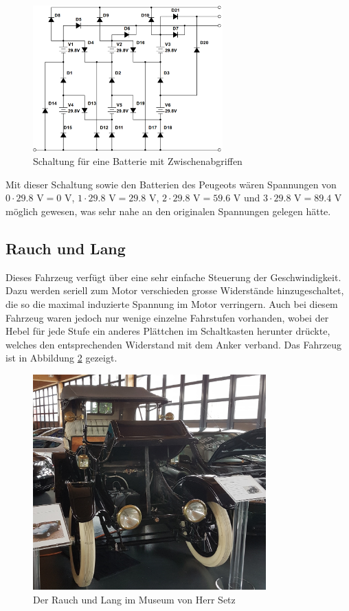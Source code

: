 \begin{figure}[h!]
	\centering
		\includegraphics[width=0.65\textwidth]{images/68.PNG}
	\caption{Schaltung für eine Batterie mit Zwischenabgriffen}
	\label{fig:68}
\end{figure}

Mit dieser Schaltung sowie den Batterien des Peugeots wären Spannungen von $0\cdot29.8$ V$=0$ V, $1\cdot29.8$ V$=29.8$ V, $2\cdot29.8$ V$=59.6$ V und $3\cdot29.8$ V$=89.4$ V möglich gewesen, was sehr nahe an den originalen Spannungen gelegen hätte.

\subsection{Rauch und Lang}
Dieses Fahrzeug verfügt über eine sehr einfache Steuerung der Geschwindigkeit. Dazu werden seriell zum Motor verschieden grosse Widerstände hinzugeschaltet, die so die maximal induzierte Spannung im Motor verringern. Auch bei diesem Fahrzeug waren jedoch nur wenige einzelne Fahrstufen vorhanden, wobei der Hebel für jede Stufe ein anderes Plättchen im Schaltkasten herunter drückte, welches den entsprechenden Widerstand mit dem Anker verband. Das Fahrzeug ist in Abbildung \ref{fig:Setz} gezeigt.

\begin{figure}[p]
	\centering
		\includegraphics[width=0.8\textwidth]{images/Setz.JPG}
	\caption{Der Rauch und Lang im Museum von Herr Setz}
	\label{fig:Setz}
\end{figure}

